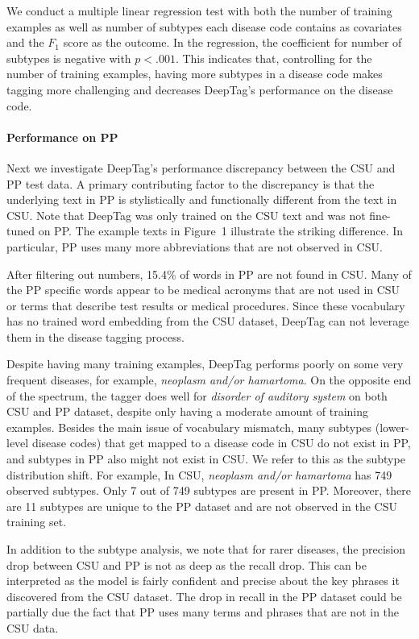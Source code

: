 \documentclass{article}[11pt,oneside]
\begin{document}
We conduct a multiple linear regression test with both the number of training examples as well as number of subtypes each disease code contains as covariates and the $F_1$ score as the outcome. In the regression, the coefficient for number of subtypes is negative with $p < .001$. This indicates that, controlling for the number of training examples, having more subtypes in a disease code makes tagging more challenging and decreases DeepTag's performance on the disease code.

\paragraph{Performance on PP}

Next we investigate DeepTag's performance discrepancy between the CSU and PP test data. A primary contributing factor to the discrepancy is that the underlying text in PP is stylistically and functionally different from the text in CSU. Note that DeepTag was only trained on the CSU text and was not fine-tuned on PP. The example texts in Figure~1 illustrate the striking difference. In particular, PP uses many more abbreviations that are not observed in CSU.

After filtering out numbers, 15.4\% of words in PP are not found in CSU. Many of the PP specific words appear to be medical acronyms that are not used in CSU or terms that describe test results or medical procedures. Since these vocabulary has no trained word embedding from the CSU dataset, DeepTag can not leverage them in the disease tagging process. 

Despite having many training examples, DeepTag performs poorly on some very frequent diseases, for example, \emph{neoplasm and/or hamartoma}. 
On the opposite end of the spectrum, the tagger does well for \emph{disorder of auditory system} on both CSU and PP dataset, despite only having a moderate amount of training examples. Besides the main issue of vocabulary mismatch, many subtypes (lower-level disease codes) that get mapped to a disease code in CSU do not exist in PP, and subtypes in PP also might not exist in CSU. We refer to this as the subtype distribution shift.
For example, In CSU, \emph{neoplasm and/or hamartoma} has 749 observed subtypes. Only 7 out of 749 subtypes are present in PP. Moreover, there are 11 subtypes are unique to the PP dataset and are not observed in the CSU training set. 

In addition to the subtype analysis, we note that for rarer diseases, the precision drop between CSU and PP is not as deep as the recall drop. This can be interpreted as the model is fairly confident and precise about the key phrases it discovered from the CSU dataset. The drop in recall in the PP dataset could be partially due the fact that PP uses many terms and phrases that are not in the CSU data.
\end{document}

